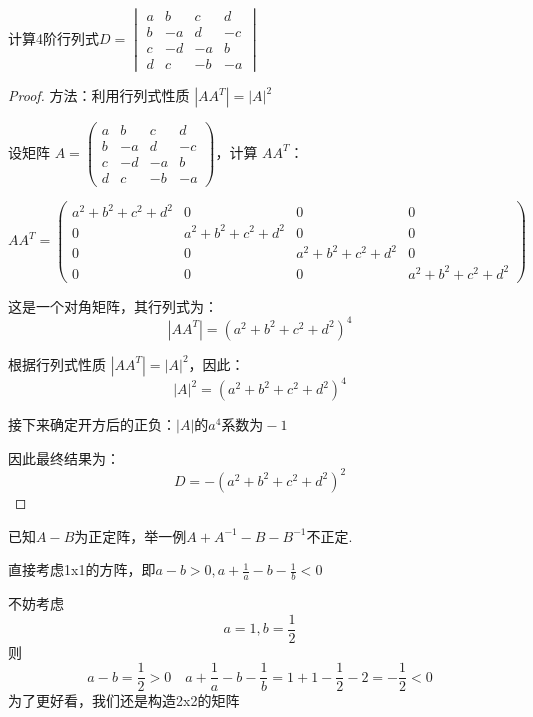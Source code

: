\vspace{2mm}
\begin{example}
计算4阶行列式$ D = 
\begin{vmatrix}
a & b & c & d \\
b & -a & d & -c \\
c & -d & -a & b \\
d & c & -b & -a
\end{vmatrix}$
\end{example}
\begin{proof}
方法：利用行列式性质 \(|AA^T| = |A|^2\)

设矩阵 \(A = 
\begin{pmatrix}
a & b & c & d \\
b & -a & d & -c \\
c & -d & -a & b \\
d & c & -b & -a
\end{pmatrix}\)，计算 \(AA^T\)：

\[
AA^T =
\begin{pmatrix}
a^2 + b^2 + c^2 + d^2 & 0 & 0 & 0 \\
0 & a^2 + b^2 + c^2 + d^2 & 0 & 0 \\
0 & 0 & a^2 + b^2 + c^2 + d^2 & 0 \\
0 & 0 & 0 & a^2 + b^2 + c^2 + d^2
\end{pmatrix}
\]

这是一个对角矩阵，其行列式为：
\[
|AA^T| = (a^2 + b^2 + c^2 + d^2)^4
\]

根据行列式性质 \(|AA^T| = |A|^2\)，因此：
\[
|A|^2 = (a^2 + b^2 + c^2 + d^2)^4
\]

接下来确定开方后的正负：$|A|\text{的}a^4\text{系数为}-1 $

因此最终结果为：
\[
D = -(a^2 + b^2 + c^2 + d^2)^2
\]
\end{proof}

\begin{example}[复旦2025]
已知$ A-B$为正定阵，举一例$A + A^{-1} -B - B^{-1} $不正定.
\end{example} 

\begin{remark}
直接考虑1x1的方阵，即$ a-b > 0 , a + \frac{1}{a} - b - \frac{1}{b} < 0  $

不妨考虑 \[ a = 1 , b= \frac{1}{2} \]
则\[ a-b= \frac{1}{2} > 0 \quad a + \frac{1}{a} - b - \frac{1}{b} = 1 + 1 - \frac{1}{2} - 2 = -\frac{1}{2} < 0 \]
为了更好看，我们还是构造2x2的矩阵
\end{remark}

